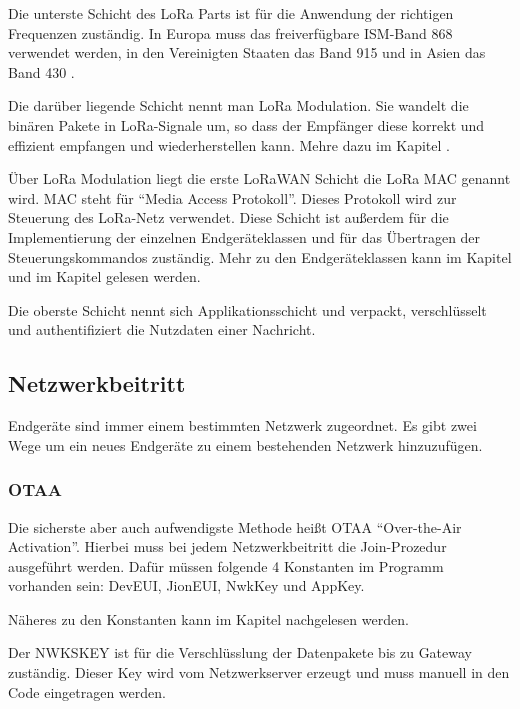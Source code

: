 \documentclass[a4paper,12pt]{article}
\begin{document}
            Die unterste Schicht des LoRa Parts ist für die Anwendung der richtigen Frequenzen zuständig. In Europa 
            muss das freiverfügbare ISM-Band 868 verwendet werden, in den Vereinigten Staaten das Band 915 und 
            in Asien das Band 430 .\cite[S.7]{WhatIsLoRa}

            Die darüber liegende Schicht nennt man LoRa Modulation. Sie wandelt die binären Pakete in 
            LoRa-Signale um, so dass der Empfänger diese korrekt und effizient empfangen und wiederherstellen 
            kann. Mehre dazu im Kapitel .

            Über LoRa Modulation liegt die erste LoRaWAN Schicht die LoRa MAC genannt wird. MAC steht für ``Media Access 
            Protokoll''. Dieses Protokoll wird zur Steuerung des LoRa-Netz verwendet. Diese Schicht ist außerdem für 
            die Implementierung der einzelnen Endgeräteklassen 
            und für das Übertragen der Steuerungskommandos zuständig. Mehr zu den Endgeräteklassen kann im Kapitel 
             und im Kapitel  gelesen werden.

            Die oberste Schicht nennt sich Applikationsschicht und verpackt, verschlüsselt und authentifiziert 
            die Nutzdaten einer Nachricht.
        \subsection{Netzwerkbeitritt}
            Endgeräte sind immer einem bestimmten Netzwerk zugeordnet. Es gibt zwei Wege um ein neues Endgeräte zu einem 
            bestehenden Netzwerk hinzuzufügen.
            \subsubsection{OTAA} \label{sec:OTAA}
                Die sicherste aber auch aufwendigste Methode heißt 
                OTAA ``Over-the-Air Activation''. Hierbei muss bei jedem Netzwerkbeitritt die Join-Prozedur ausgeführt
                werden. Dafür müssen folgende 4 Konstanten im Programm vorhanden sein: DevEUI, 
                JionEUI, NwkKey und AppKey.

                Näheres zu den Konstanten kann im Kapitel  nachgelesen werden.

                Der NWKSKEY ist für die Verschlüsslung der Datenpakete bis zu Gateway zuständig. Dieser Key wird 
                vom Netzwerkserver erzeugt und muss manuell in den Code eingetragen werden.\cite[S.3]{LoRaSecur}
            
\end{document}
